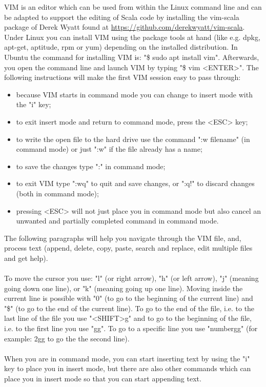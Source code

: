 \documentclass {article}
\begin{document}
VIM is an editor which can be used from within the Linux command line and can be adapted to support the editing of Scala code by installing the vim-scala package of Derek Wyatt found at \href{https://github.com/derekwyatt/vim-scala}{https://github.com/derekwyatt/vim-scala}. 
Under Linux you can install VIM using the package tools at hand (like e.g. dpkg, apt-get, aptitude, rpm or yum) depending on the installed distribution.
 In Ubuntu the command for installing VIM is:  "\$ sudo apt install vim". Afterwards, you open the command line and launch VIM by typing "\$ vim <ENTER>". The following instructions will make the first VIM session easy to pass through:
\begin{itemize}
\item because VIM starts in command mode you can change to insert mode with the "i" key;
\item to exit insert mode and return to command mode, press the <ESC> key;
\item to write the open file to the hard drive use the command ":w filename" (in command mode) or just ":w" if the file already has a name; 
\item to save the changes type ":" in command mode;
\item to exit VIM type ":wq" to quit and save changes, or ":q!" to discard changes (both in command mode);
\item pressing <ESC> will not just place you in command mode but also cancel an unwanted and partially completed command in command mode.
\end{itemize}
The following paragraphs will help you navigate through the VIM file, and, process text (append, delete, copy, paste, search and replace, edit multiple files and get help). 
\\
\\
To move the cursor you use: "l" (or right arrow), "h" (or left arrow), "j" (meaning going down one line), or "k" (meaning going up one line). 
Moving inside the current line is possible with "0" (to go to the beginning of the current line) and "\$" (to go to the end of the current line). 
To go to the end of the file, i.e. to the last line of the file you use "<SHIFT>g" and to go to the beginning of the file, i.e. to the first line you use "gg".
 To go to a specific line you use "numbergg" (for example: 2gg to go the the second line).
\\
\\
When you are in command mode, you can start inserting text by using the "i" key to place you in insert mode, but there are also other commands which can place you in insert mode so that you can start appending text. 
\end{document}
